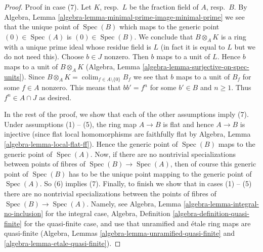 \documentclass[10pt,a4paper]{amsart}
\theoremstyle{plain}
\theoremstyle{definition}
\theoremstyle{remark}
\numberwithin{equation}{subsection}
\def\colim{\mathop{\mathrm{colim}}\nolimits}
\def\Spec{\mathop{\mathrm{Spec}}}
\begin{document}
\begin{proof}
Proof in case (7).
Let $K$, resp.\ $L$ be the fraction field of $A$, resp.\ $B$.
By Algebra, Lemma
\ref{algebra-lemma-minimal-prime-image-minimal-prime} we see that
the unique point of $\Spec(B)$ which maps to the generic
point $(0) \in \Spec(A)$ is $(0) \in \Spec(B)$.
We conclude that $B \otimes_A K$ is a ring with a unique prime
ideal whose residue field is $L$ (in fact it is equal to $L$ but
we do not need this).
Choose $b \in J$ nonzero. Then $b$ maps to a unit of $L$.
Hence $b$ maps to a unit of $B \otimes_A K$
(Algebra, Lemma \ref{algebra-lemma-surjective-on-spec-units}).
Since $B \otimes_A K = \colim_{f \in A \setminus \{0\}} B_f$
we see that $b$ maps to a unit of $B_f$ for some $f \in A$ nonzero.
This means that $b b' = f^n$ for some $b' \in B$ and $n \geq 1$.
Thus $f^n \in A \cap J$ as desired.

\medskip\noindent
In the rest of the proof, we show that each of the other assumptions imply (7).
Under assumptions (1) -- (5), the ring map $A \to B$ is flat and
hence $A \to B$ is injective (since flat local homomorphisms are
faithfully flat by Algebra, Lemma \ref{algebra-lemma-local-flat-ff}).
Hence the generic point of $\Spec(B)$
maps to the generic point of $\Spec(A)$. Now, if there are no
nontrivial specializations
between points of fibres of $\Spec(B) \to \Spec(A)$, then of course
this generic point of $\Spec(B)$ has to be the unique point mapping
to the generic point of $\Spec(A)$. So (6) implies (7).
Finally, to finish we show that in cases (1) -- (5) there are no
nontrivial specializations
between the points of fibres of $\Spec(B) \to \Spec(A)$.
Namely, see
Algebra, Lemma \ref{algebra-lemma-integral-no-inclusion} for
the integral case,
Algebra, Definition \ref{algebra-definition-quasi-finite}
for the quasi-finite case, and use that
unramified and \'etale ring maps are quasi-finite
(Algebra, Lemmas \ref{algebra-lemma-unramified-quasi-finite} and
\ref{algebra-lemma-etale-quasi-finite}).
\end{proof}
\end{document}
